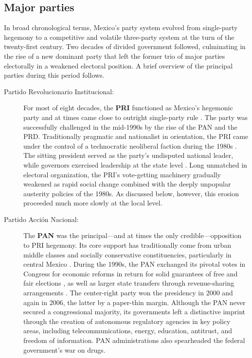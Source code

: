 \documentclass[letter,12pt]{article}
\begin{document}
\subsection{Major parties}

In broad chronological terms, Mexico's party system evolved from single-party hegemony to a competitive and volatile three-party system at the turn of the twenty-first century. Two decades of divided government followed, culminating in the rise of a new dominant party that left the former trio of major parties electorally in a weakened electoral position. A brief overview of the principal parties during this period follows.

\begin{description}

\item[Partido Revolucionario Institucional:] For most of eight decades, the \textbf{PRI} functioned as Mexico's hegemonic party and at times came close to outright single-party rule \citep{molinar.1991a}. The party was successfully challenged in the mid-1990s by the rise of the PAN and the PRD. Traditionally pragmatic and nationalist in orientation, the PRI came under the control of a technocratic neoliberal faction during the 1980s \citep{dresser.Neolib1991}. The sitting president served as the party's undisputed national leader, while governors exercised leadership at the state level \citep{langston.2010}. Long unmatched in electoral organization, the PRI's vote-getting machinery gradually weakened as rapid social change combined with the deeply unpopular austerity policies of the 1980s. As discussed below, however, this erosion proceeded much more slowly at the local level.

\item[Partido Acción Nacional:] The \textbf{PAN} was the principal---and at times the only credible---opposition to PRI hegemony. Its core support has traditionally come from urban middle classes and socially conservative constituencies, particularly in central Mexico \citep{loaeza.pan.2010book}. During the 1990s, the PAN exchanged its pivotal votes in Congress for economic reforms in return for solid guarantees of free and fair elections \citep{cornelius.1996}, as well as larger state transfers through revenue-sharing arrangements \citep{diaz.cayeros.2006, shirk.PANbook.2005}. The center-right party won the presidency in 2000 and again in 2006, the latter by a paper-thin margin. Although the PAN never secured a congressional majority, its governments left a distinctive imprint through the creation of autonomous regulatory agencies in key policy areas, including telecommunications, energy, education, antitrust, and freedom of information. PAN administrations also spearheaded the federal government's war on drugs.


\end{description}
\end{document}
